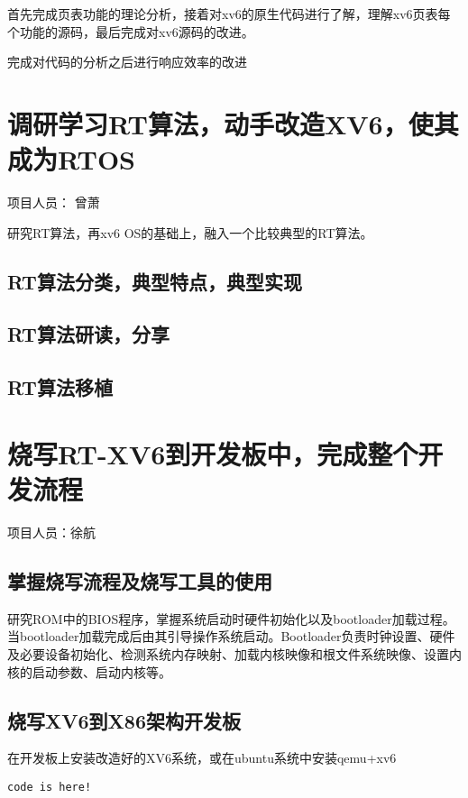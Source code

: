 首先完成页表功能的理论分析，接着对xv6的原生代码进行了解，理解xv6页表每个功能的源码，最后完成对xv6源码的改进。

完成对代码的分析之后进行响应效率的改进

\section{调研学习RT算法，动手改造XV6，使其成为RTOS}
项目人员： 曾萧

研究RT算法，再xv6 OS的基础上，融入一个比较典型的RT算法。
\subsection{RT算法分类，典型特点，典型实现}
\subsection{RT算法研读，分享}
\subsection{RT算法移植}


\section{烧写RT-XV6到开发板中，完成整个开发流程}
项目人员：徐航
\subsection{掌握烧写流程及烧写工具的使用}
研究ROM中的BIOS程序，掌握系统启动时硬件初始化以及bootloader加载过程。当bootloader加载完成后由其引导操作系统启动。Bootloader负责时钟设置、硬件及必要设备初始化、检测系统内存映射、加载内核映像和根文件系统映像、设置内核的启动参数、启动内核等。
\subsection{烧写XV6到X86架构开发板}
在开发板上安装改造好的XV6系统，或在ubuntu系统中安装qemu+xv6



\begin{lstlisting}
code is here!
\end{lstlisting}
